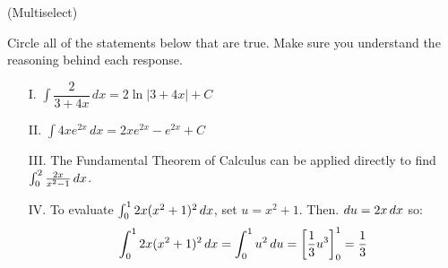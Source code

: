 \documentclass[handout,hints]{ximera}
\begin{document}
\begin{problem}
(Multiselect)

Circle all of the statements below that are true.  Make sure you understand the reasoning behind each response.

\begin{itemize}
\item[I.] $\displaystyle \int \dfrac{2}{3+4x} \, dx = 2\ln|3+4x|+C$

\item[II.] $\displaystyle \int 4xe^{2x} \, dx = 2xe^{2x}-e^{2x}+C$

\item[III.] The Fundamental Theorem of Calculus can be applied directly to find $ \int_0^2 \frac{2x}{x^2-1} \mathop{}\!d x$.

\item[IV.] To evaluate $ \int_0^1 2x(x^2+1)^2 \mathop{}\!d x$, set $u=x^2+1$.  Then. $\mathop{}\!d u = 2x \mathop{}\!d x$ so:
\[ \int_0^1 2x(x^2+1)^2 \mathop{}\!d x = \int_0^1 u^2 \mathop{}\!d u = \bigg[ \frac{1}{3} u^3 \bigg]_0^1 = \frac{1}{3}\]
\end{itemize}

\end{problem}
\end{document}
